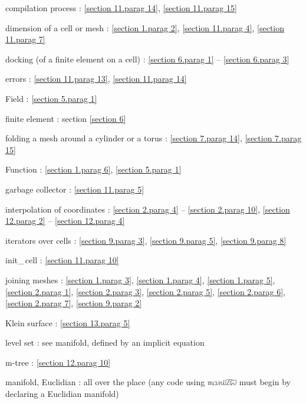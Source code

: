 \documentclass[a4paper]{scrreprt}
\def\numb{}
\newcommand\maniFEM{\leavevmode\hbox{\includegraphics[width=13mm]{manifem-small}}}
\newcommand\verm[1]{\textcolor{manif}{#1}}
\renewcommand\tt{\normalfont\ttfamily}
\begin{document}
\noindent
compilation process : \ref{\numb section 11.\numb parag 14},
\ref{\numb section 11.\numb parag 15}

\noindent
dimension of a cell or mesh : \ref{\numb section 1.\numb parag 2},
\ref{\numb section 11.\numb parag 4}, \ref{\numb section 11.\numb parag 7}

\noindent
docking (of a finite element on a cell) :
\ref{\numb section 6.\numb parag 1} -- \ref{\numb section 6.\numb parag 3}

\noindent
errors : \ref{\numb section 11.\numb parag 13}, \ref{\numb section 11.\numb parag 14}

\noindent
{\small\tt \verm{Field}} : \ref{\numb section 5.\numb parag 1}

\noindent
finite element : section \ref{\numb section 6}

\noindent
folding a mesh around a cylinder or a torus : \ref{\numb section 7.\numb parag 14},
\ref{\numb section 7.\numb parag 15}

\noindent
{\small\tt \verm{Function}} : \ref{\numb section 1.\numb parag 6},
\ref{\numb section 5.\numb parag 1}

\noindent
garbage collector : \ref{\numb section 11.\numb parag 5}

\noindent
interpolation of coordinates :
\ref{\numb section 2.\numb parag 4} -- \ref{\numb section 2.\numb parag 10},
\ref{\numb section 12.\numb parag 2} -- \ref{\numb section 12.\numb parag 4}

\noindent
iterators over cells : \ref{\numb section 9.\numb parag 3}, \ref{\numb section 9.\numb parag 5},
\ref{\numb section 9.\numb parag 8}

\noindent
{\small\tt init\_\,cell} : \ref{\numb section 11.\numb parag 10}

\noindent
{\small\tt join}ing meshes : \ref{\numb section 1.\numb parag 3},
\ref{\numb section 1.\numb parag 4}, \ref{\numb section 1.\numb parag 5},
\ref{\numb section 2.\numb parag 1}, \ref{\numb section 2.\numb parag 3},
\ref{\numb section 2.\numb parag 5}, \ref{\numb section 2.\numb parag 6},
\ref{\numb section 2.\numb parag 7}, \ref{\numb section 9.\numb parag 2}

\noindent
Klein surface : \ref{\numb section 13.\numb parag 5}

\noindent
level set : see manifold, defined by an implicit equation

\noindent
m-tree : \ref{\numb section 12.\numb parag 10}

\noindent
manifold, Euclidian : all over the place\hfil\break
\hglue 15mm (any code using {\maniFEM} must begin by declaring a Euclidian manifold)
\end{document}
